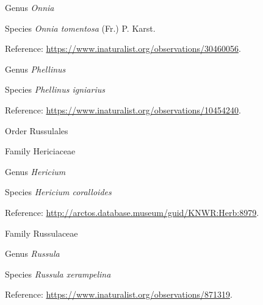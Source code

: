 \documentclass[9pt, article]{memoir}
\begin{document}
\begin{multicols}{2}
\vspace{6pt}\noindent\hspace{30pt}Genus \textit{Onnia}


\vspace{6pt}\noindent\hspace{36pt}Species \textit{Onnia tomentosa} (Fr.) P. Karst.


\vspace{6pt}Reference: 
\url{https://www.inaturalist.org/observations/30460056}.

\vspace{6pt}\noindent\hspace{30pt}Genus \textit{Phellinus}


\vspace{6pt}\noindent\hspace{36pt}Species \textit{Phellinus igniarius}


\vspace{6pt}Reference: 
\url{https://www.inaturalist.org/observations/10454240}.

\vspace{6pt}\noindent\hspace{18pt}Order Russulales


\vspace{6pt}\noindent\hspace{24pt}Family Hericiaceae


\vspace{6pt}\noindent\hspace{30pt}Genus \textit{Hericium}


\vspace{6pt}\noindent\hspace{36pt}Species \textit{Hericium coralloides}


\vspace{6pt}Reference: 
\url{http://arctos.database.museum/guid/KNWR:Herb:8979}.

\vspace{6pt}\noindent\hspace{24pt}Family Russulaceae


\vspace{6pt}\noindent\hspace{30pt}Genus \textit{Russula}


\vspace{6pt}\noindent\hspace{36pt}Species \textit{Russula xerampelina}


\vspace{6pt}Reference: 
\url{https://www.inaturalist.org/observations/871319}.


\end{multicols}
\end{document}
